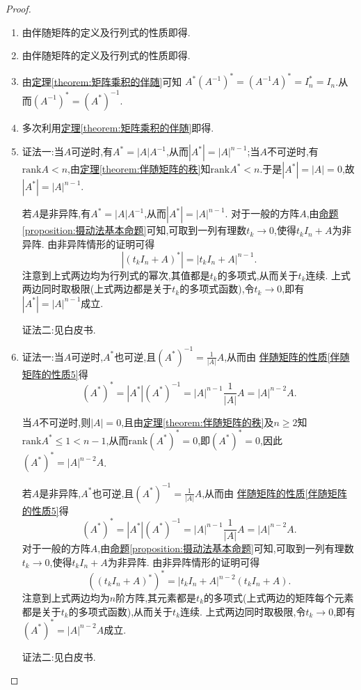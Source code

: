 \documentclass[lang=cn,newtx,10pt,scheme=chinese]{elegantbook}
\begin{document}
\begin{proof}
\begin{enumerate}
\item 由伴随矩阵的定义及行列式的性质即得.

\item 由伴随矩阵的定义及行列式的性质即得.

\item 由\hyperref[theorem:矩阵乘积的伴随]{定理\ref{theorem:矩阵乘积的伴随}}可知
$A^*\left( A^{-1} \right) ^*=\left( A^{-1}A \right) ^*=I_{n}^{*}=I_n$.从而$(A^{-1})^* = (A^*)^{-1}$.

\item 多次利用\hyperref[theorem:矩阵乘积的伴随]{定理\ref{theorem:矩阵乘积的伴随}}即得.

\item 
{\color{blue}证法一:}当\(A\)可逆时,有\(A^* = |A|A^{-1}\),从而\(|A^*| = |A|^{n - 1}\);当\(A\)不可逆时,有$\mathrm{rank}A<n$,由\hyperref[theorem:伴随矩阵的秩]{定理\ref{theorem:伴随矩阵的秩}}知$\mathrm{rank}A^*<n$.于是\(|A^*| = |A| = 0\),故\(|A^*| = |A|^{n - 1}\).

若\(A\)是非异阵,有\(A^* = |A|A^{-1}\),从而\(|A^*| = |A|^{n - 1}\). 对于一般的方阵\(A\),由\hyperref[proposition:摄动法基本命题]{命题\ref{proposition:摄动法基本命题}}可知,可取到一列有理数\(t_k\rightarrow0\),使得\(t_kI_n + A\)为非异阵. 由非异阵情形的证明可得
\[
|(t_kI_n + A)^*| = |t_kI_n + A|^{n - 1}.
\]
注意到上式两边均为行列式的幂次,其值都是\(t_k\)的多项式,从而关于\(t_k\)连续. 上式两边同时取极限(上式两边都是关于$t_k$的多项式函数),令\(t_k\rightarrow0\),即有\(|A^*| = |A|^{n - 1}\)成立.

{\color{blue}证法二:}见白皮书.

\item {\color{blue}证法一:}当\(A\)可逆时,\(A^*\)也可逆,且\((A^*)^{-1} = \frac{1}{|A|}A\),从而由 \hyperref[伴随矩阵的性质5]{伴随矩阵的性质\ref{伴随矩阵的性质5}}得
\[
(A^*)^* = |A^*|(A^*)^{-1} = |A|^{n - 1}\frac{1}{|A|}A = |A|^{n - 2}A.
\]

当\(A\)不可逆时,则\(|A| = 0\),且由\hyperref[theorem:伴随矩阵的秩]{定理\ref{theorem:伴随矩阵的秩}}及$n\geq 2$知\(\mathrm{rank}A^* \leq 1<n-1\),从而\(\mathrm{rank}(A^*)^* = 0\),即\((A^*)^* = 0\),因此\((A^*)^* = |A|^{n - 2}A\).

若\(A\)是非异阵,\(A^*\)也可逆,且\((A^*)^{-1} = \frac{1}{|A|}A\),从而由 \hyperref[伴随矩阵的性质5]{伴随矩阵的性质\ref{伴随矩阵的性质5}}得
\[
(A^*)^* = |A^*|(A^*)^{-1} = |A|^{n - 1}\frac{1}{|A|}A = |A|^{n - 2}A.
\]
对于一般的方阵\(A\),由\hyperref[proposition:摄动法基本命题]{命题\ref{proposition:摄动法基本命题}}可知,可取到一列有理数\(t_k\rightarrow0\),使得\(t_kI_n + A\)为非异阵. 由非异阵情形的证明可得
\[
((t_kI_n + A)^*)^* = |t_kI_n + A|^{n - 2}(t_kI_n + A).
\]
注意到上式两边均为\(n\)阶方阵,其元素都是\(t_k\)的多项式(上式两边的矩阵每个元素都是关于$t_k$的多项式函数),从而关于\(t_k\)连续. 上式两边同时取极限,令\(t_k\rightarrow0\),即有\((A^*)^* = |A|^{n - 2}A\)成立. 

{\color{blue}证法二:}见白皮书.
\end{enumerate}
\end{proof}
\end{document}
